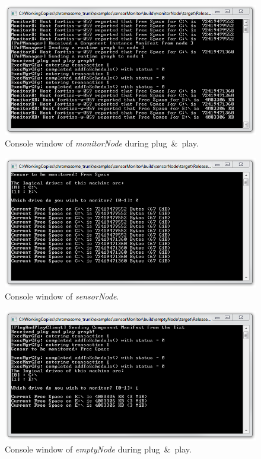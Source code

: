 \begin{figure}[htpb]
	\centering
	\includegraphics[scale=0.7]{figures/example_pnp_monitorNode.png}
	\caption{Console window of \emph{monitorNode} during plug~\&~play.}
	\label{fig:example_pnp_monitorNode}
\end{figure}

\begin{figure}[htpb]
	\centering
	\includegraphics[scale=0.7]{figures/example_pnp_sensorNode.png}
	\caption{Console window of \emph{sensorNode}.}
	\label{fig:example_pnp_sensorNode}
\end{figure}

\begin{figure}[htpb]
	\centering
	\includegraphics[scale=0.7]{figures/example_pnp_emptyNode.png}
	\caption{Console window of \emph{emptyNode} during plug~\&~play.}
	\label{fig:example_pnp_emptyNode}
\end{figure}

